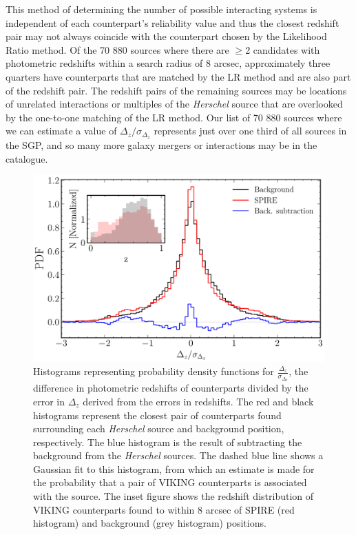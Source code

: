 \documentclass[fleqn,usenatbib]{mnras}
\begin{document}
This method of determining the number of possible interacting systems is independent of each counterpart’s reliability value and thus the closest redshift pair may not always coincide with the counterpart chosen by the Likelihood Ratio method. Of the 70 880 sources where there are $\geq$2 candidates with photometric redshifts within a search radius of 8 arcsec, approximately three quarters have counterparts that are matched by the LR method and are also part of the redshift pair. The redshift pairs of the remaining sources may be locations of unrelated interactions or multiples of the \textit{Herschel} source that are overlooked by the one-to-one matching of the LR method. Our list of 70 880 sources where we can estimate a value of $\Delta_z/\sigma_{\Delta_z}$ represents just over one third of all sources in the SGP, and so many more galaxy mergers or interactions may be in the catalogue. 

\begin{figure}
	\includegraphics[width=\columnwidth]{Fig_6}
	\caption{Histograms representing probability density functions for $\frac{\Delta_z}{\sigma_{\Delta_z}}$, the difference in photometric redshifts of counterparts divided by the error in $\Delta_z$ derived from the errors in redshifts. The red and black histograms represent the closest pair of counterparts found surrounding each \textit{Herschel} source and background position, respectively. The blue histogram is the result of subtracting the background from the \textit{Herschel} sources. The dashed blue line shows a Gaussian fit to this histogram, from which an estimate is made for the probability that a pair of VIKING counterparts is associated with the source. The inset figure shows the redshift distribution of VIKING counterparts found to within 8 arcsec of SPIRE (red histogram) and background (grey histogram) positions.} 
	\label{fig:deltaz}
\end{figure}
\end{document}
